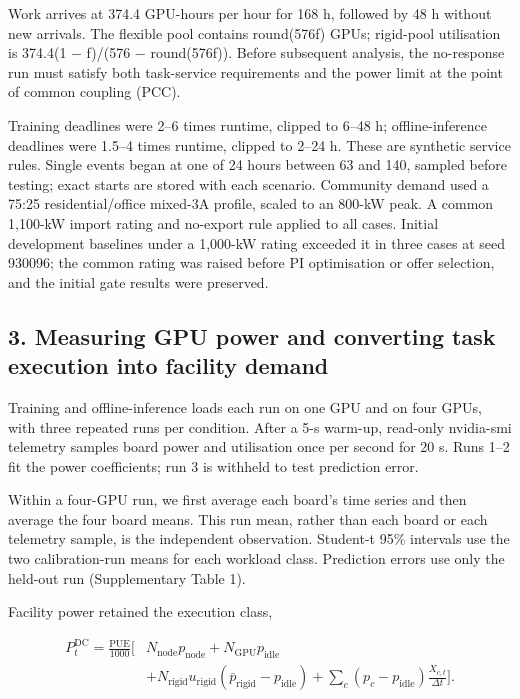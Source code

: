 \documentclass[10pt,a4paper]{article}
\begin{document}
Work arrives at 374.4 GPU-hours per hour for 168 h, followed by 48 h without new arrivals. The flexible pool contains round(576f) GPUs; rigid-pool utilisation is 374.4(1 − f)/(576 − round(576f)). Before subsequent analysis, the no-response run must satisfy both task-service requirements and the power limit at the point of common coupling (PCC).


Training deadlines were 2–6 times runtime, clipped to 6–48 h; offline-inference deadlines were 1.5–4 times runtime, clipped to 2–24 h. These are synthetic service rules. Single events began at one of 24 hours between 63 and 140, sampled before testing; exact starts are stored with each scenario. Community demand used a 75:25 residential/office mixed-3A profile, scaled to an 800-kW peak. A common 1,100-kW import rating and no-export rule applied to all cases. Initial development baselines under a 1,000-kW rating exceeded it in three cases at seed 930096; the common rating was raised before PI optimisation or offer selection, and the initial gate results were preserved.


\subsection{3. Measuring GPU power and converting task execution into facility demand}

Training and offline-inference loads each run on one GPU and on four GPUs, with three repeated runs per condition. After a 5-s warm-up, read-only nvidia-smi telemetry samples board power and utilisation once per second for 20 s. Runs 1–2 fit the power coefficients; run 3 is withheld to test prediction error.


Within a four-GPU run, we first average each board's time series and then average the four board means. This run mean, rather than each board or each telemetry sample, is the independent observation. Student-t 95\% intervals use the two calibration-run means for each workload class. Prediction errors use only the held-out run (Supplementary Table 1).


Facility power retained the execution class,


\begin{equation*}
\begin{aligned}
P^{\mathrm{DC}}_t=\frac{\mathrm{PUE}}{1000}\Big[&N_{\mathrm{node}}p_{\mathrm{node}}+N_{\mathrm{GPU}}p_{\mathrm{idle}}\\
&+N_{\mathrm{rigid}}u_{\mathrm{rigid}}(\bar p_{\mathrm{rigid}}-p_{\mathrm{idle}})
+\sum_c(p_c-p_{\mathrm{idle}})\frac{X_{c,t}}{\Delta t}\Big].
\end{aligned}
\end{equation*}
\end{document}
